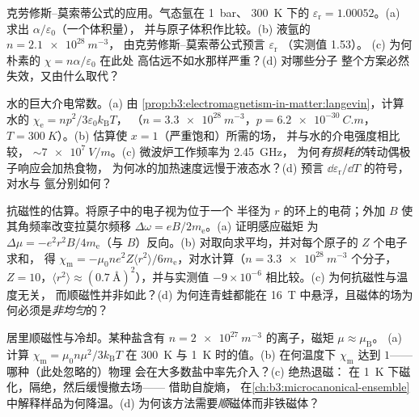 \begin{exercise}[$\star\star$]\label{exo:b3:electromagnetism-in-matter:6}
克劳修斯–莫索蒂公式的应用。气态氩在 \qty{1}{bar}、
\qty{300}{K} 下的 $\varepsilon_{\text{r}} = 1.00052$。(a) 求出 $\alpha/\varepsilon_0$（一个体积量），
并与原子体积作比较。(b) 液氩的 $n = \qty{2.1e28}{m^{-3}}$，
由克劳修斯–莫索蒂公式预言 $\varepsilon_{\text{r}}$
（实测值 1.53）。
(c) 为何朴素的 $\chi = n\alpha/\varepsilon_0$ 在此处
高估远不如水那样严重？(d) 对哪些分子
整个方案必然失效，又由什么取代？
\end{exercise}

\begin{exercise}[$\star\star$]\label{exo:b3:electromagnetism-in-matter:7}
水的巨大介电常数。(a) 由
\cref{prop:b3:electromagnetism-in-matter:langevin}，计算
水的 $\chi_{\text{e}} = np^2/3\varepsilon_0k_{\text{B}}T$，
（$n = \qty{3.3e28}{m^{-3}}$，$p = \qty{6.2e-30}{C.m}$，
$T = \qty{300}{K}$）。(b) 估算使 $x = 1$（严重饱和）所需的场，
并与水的介电强度相比较，
$\sim\qty{7e7}{V/m}$。(c) 微波炉工作频率为 \qty{2.45}{GHz}，
为何\emph{有损耗的}转动偶极子响应会加热食物，
为何冰的加热速度远慢于液态水？(d) 预言
$\dd\varepsilon_{\text{r}}/\dd T$ 的符号，对水与
氩分别如何？
\end{exercise}

\begin{exercise}[$\star\star$]\label{exo:b3:electromagnetism-in-matter:8}
抗磁性的估算。将原子中的电子视为位于一个
半径为 $r$ 的环上的电荷；外加 $B$ 使其角频率改变拉莫尔频移
$\Delta\omega = eB/2m_{\text{e}}$。(a) 证明感应磁矩
为 $\Delta\mu = -e^2r^2B/4m_{\text{e}}$（与
$B$）反向。(b) 对取向求平均，并对每个原子的 $Z$ 个电子求和，
得 $\chi_{\text{m}} = -\mu_0ne^2Z\langle
r^2\rangle/6m_{\text{e}}$，对水计算（$n =
\qty{3.3e28}{m^{-3}}$ 个分子，$Z = 10$，$\langle r^2\rangle
\approx (\qty{0.7}{\angstrom})^2$），并与实测值
$-9\times10^{-6}$ 相比较。(c) 为何抗磁性与温度无关，
而顺磁性并非如此？(d) 为何连青蛙都能在
\qty{16}{T} 中悬浮，且磁体的场为何必须是\emph{非均匀}的？
\end{exercise}

\begin{exercise}[$\star\star$]\label{exo:b3:electromagnetism-in-matter:9}
居里顺磁性与冷却。某种盐含有 $n =
\qty{2e27}{m^{-3}}$ 的离子，磁矩 $\mu \approx \mu_{\text{B}}$。
(a) 计算 $\chi_{\text{m}} = \mu_0n\mu^2/3k_{\text{B}}T$ 在
\qty{300}{K} 与 \qty{1}{K} 时的值。(b) 在何温度下
$\chi_{\text{m}}$ 达到 $1$——哪种（此处忽略的）物理
会在大多数盐中率先介入？(c) 绝热退磁：
在 \qty{1}{K} 下磁化，隔绝，然后缓慢撤去场——
借助自旋熵，
在\cref{ch:b3:microcanonical-ensemble}中解释样品为何降温。(d)
为何该方法需要\emph{顺}磁体而非铁磁体？
\end{exercise}

